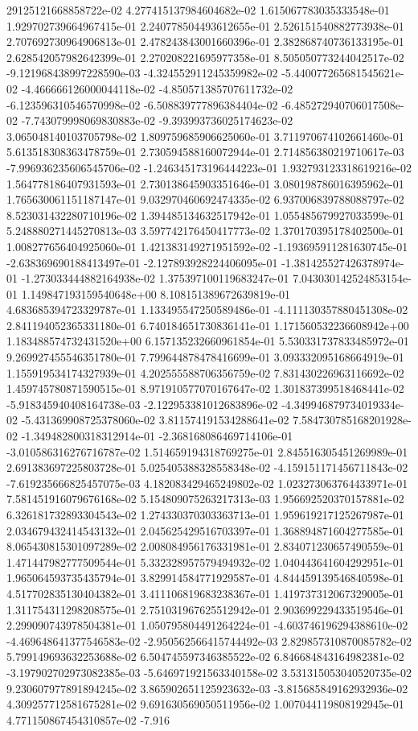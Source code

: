 29125121668858722e-02	4.277415137984604682e-02	1.615067783035333548e-01	1.929702739664967415e-01	2.240778504493612655e-01	2.526151540882773938e-01	2.707692730964906813e-01	2.478243843001660396e-01	2.382868740736133195e-01	2.628542057982642399e-01	2.270208221695977358e-01	8.505050773244042517e-02	-9.121968438997228590e-03	-4.324552911245359982e-02	-5.440077265681545621e-02	-4.466666126000044118e-02	-4.850571385707611732e-02	-6.123596310546570998e-02	-6.508839777896384404e-02	-6.485272940706017508e-02	-7.743079998069830883e-02	-9.393993736025174623e-02	3.065048140103705798e-02	1.809759685906625060e-01	3.711970674102661460e-01	5.613518308363478759e-01	2.730594588160072944e-01	2.714856380219710617e-03	-7.996936235606545706e-02	-1.246345173196444223e-01	1.932793123318619216e-02	1.564778186407931593e-01	2.730138645903351646e-01	3.080198786016395962e-01	1.765630061151187147e-01	9.032970460692474335e-02	6.937006839788088797e-02	8.523031432280710196e-02	1.394485134632517942e-01	1.055485679927033599e-01	5.248880271445270813e-03	3.597742176450417773e-02	1.370170395178402500e-01	1.008277656404925060e-01	1.421383149271951592e-02	-1.193695911281630745e-01	-2.638369690188413497e-01	-2.127893928224406095e-01	-1.381425527426378974e-01	-1.273033444882164938e-02	1.375397100119683247e-01	7.043030142524853154e-01	1.149847193159540648e+00	8.108151389672639819e-01	4.683685394723329787e-01	1.133495547250589486e-01	-4.111130357880451308e-02	2.841194052365331180e-01	6.740184651730836141e-01	1.171560532236608942e+00	1.183488574732431520e+00	6.157135232660961854e-01	5.530331737833485972e-01	9.269927455546351780e-01	7.799644878478416699e-01	3.093332095168664919e-01	1.155919534174327939e-01	4.202555588706356759e-02	7.831430226963116692e-02	1.459745780871590515e-01	8.971910577070167647e-02	1.301837399518468441e-02	-5.918345940408164738e-03	-2.122953381012683896e-02	-4.349946879734019334e-02	-5.431369908725378060e-02	3.811574191534288641e-02	7.584730785168201928e-02	-1.349482800318312914e-01	-2.368168086469714106e-01	-3.010586316276716787e-02	1.514659194318769275e-01	2.845516305451269989e-01	2.691383697225803728e-01	5.025405388328558348e-02	-4.159151171456711843e-02	-7.619235666825457075e-03	4.182083429465249802e-02	1.023273063764433971e-01	7.581451916079676168e-02	5.154809075263217313e-03	1.956692520370157881e-02	6.326181732893304543e-02	1.274330370303363713e-01	1.959619217125267987e-01	2.034679432414543132e-01	2.045625429516703397e-01	1.368894871604277585e-01	8.065430815301097289e-02	2.008084956176331981e-01	2.834071230657490559e-01	1.471447982777509544e-01	5.332328957579494932e-02	1.040443641604292951e-01	1.965064593735435794e-01	3.829914584771929587e-01	4.844459139546840598e-01	4.517702835130404382e-01	3.411106819683238367e-01	1.419737312067329005e-01	1.311754311298208575e-01	2.751031967625512942e-01	2.903699229433519546e-01	2.299090743978504381e-01	1.050795804491264224e-01	-4.603746196294388610e-02	-4.469648641377546583e-02	-2.950562566415744492e-03	2.829857310870085782e-02	5.799149693632253688e-02	6.504745597346385522e-02	6.846684843164982381e-02	-3.197902702973082385e-03	-5.646971921563340158e-02	3.531315053040520735e-02	9.230607977891894245e-02	3.865902651125923632e-03	-3.815685849162932936e-02	4.309257712581675281e-02	9.691630569050511956e-02	1.007044119808192945e-01	4.771150867454310857e-02	-7.916
